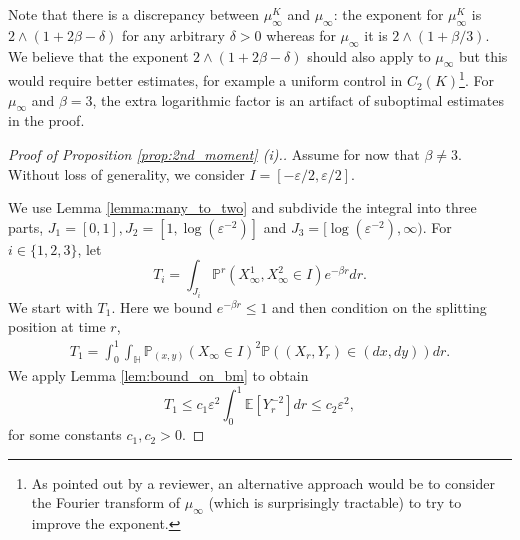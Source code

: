\documentclass{article}
\theoremstyle{definition}
\numberwithin{equation}{section}
\numberwithin{thm}{section}
\newcommand*{\eps}{\ensuremath{\varepsilon}}            %
\newcommand*{\EE}{\ensuremath{\mathbb{E}}}	        	%
\newcommand*{\PP}{\ensuremath{\mathbb{P}}}	        	%
\newcommand*{\HH}{\ensuremath{\mathbb{H}}}	        	%
\begin{document}
Note that there is a discrepancy between $\mu^K_\infty$ and $\mu_\infty$: the exponent for $\mu^K_\infty$ is $2\wedge(1+2\beta-\delta)$ for any arbitrary $\delta>0$ whereas for $\mu_\infty$ it is $2\wedge(1+\beta/3)$. We believe that the exponent $2\wedge(1+2\beta-\delta)$ should also apply to $\mu_\infty$ but this would require better estimates, for example a uniform control in $C_2(K)$\footnote{As pointed out by a reviewer, an alternative approach would be to consider the Fourier transform of $\mu_\infty$ (which is surprisingly tractable) to try to improve the exponent.}. For $\mu_\infty$ and $\beta=3$, the extra logarithmic factor is an artifact of{} suboptimal estimates in the proof. 

\begin{proof}[Proof of Proposition \ref{prop:2nd_moment} (i).] Assume for now that $\beta\neq 3$.
    Without loss of generality, we consider $I=[-\eps/2,\eps/2]$. 
    
    We use Lemma \ref{lemma:many_to_two} and subdivide the integral into three parts, $J_1=[0,1],J_2=[1,\log(\eps^{-2})]$ and $J_3=[\log(\eps^{-2}), \infty)$. For $i\in \{1,2,3\}$, let
\begin{equation*}
    T_i = \int_{J_i} \PP^r\left(X^1_\infty,X_\infty^2\in I\right) e^{-\beta r}dr.
\end{equation*}
We start with $T_1$. Here we bound $e^{-\beta r} \leq 1$ and then condition on the splitting position at time $r$,
\begin{align*}
    T_1 = \int_0^1 \int_{\HH}  \PP_{(x,y)}\left(X_\infty \in I\right)^2 \PP\left((X_r,Y_r) \in (dx,dy)\right) dr.
\end{align*}
We apply Lemma \ref{lem:bound_on_bm} {to obtain}
\begin{equation}\label{eq:T1}
    T_1 \leq c_1 \eps^2\int_0^1 \EE\left[Y_r^{-2}\right]dr \leq c_2 \eps^2,
\end{equation}
for some {constants} $c_1,c_2>0$. 


\end{proof}
\end{document}
